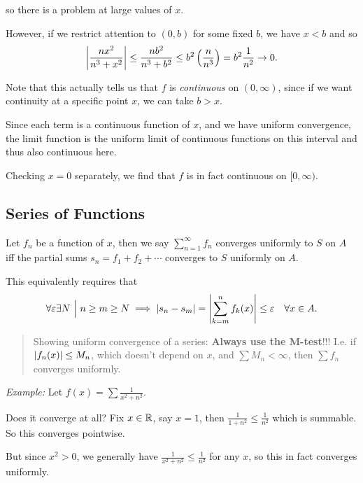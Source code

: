 so there is a problem at large values of \(x\).

However, if we restrict attention to \((0, b)\) for some fixed \(b\), we
have \(x < b\) and so
\begin{align*}
{\left\lvert {\frac{nx^2}{n^3 + x^2}} \right\rvert} \leq
\frac{nb^2}{n^3 + b^2} \leq
b^2 \left( \frac{n}{n^3} \right) =
b^2 \frac 1 {n^2} \to 0.
\end{align*}

Note that this actually tells us that \(f\) is \emph{continuous} on
\((0, \infty)\), since if we want continuity at a specific point \(x\),
we can take \(b>x\).

Since each term is a continuous function of \(x\), and we have uniform
convergence, the limit function is the uniform limit of continuous
functions on this interval and thus also continuous here.

Checking \(x=0\) separately, we find that \(f\) is in fact continuous on
\([0, \infty)\).

\hypertarget{series-of-functions}{%
\subsection{Series of Functions}\label{series-of-functions}}

Let \(f_n\) be a function of \(x\), then we say
\(\sum_{n=1}^\infty f_n\) converges uniformly to \(S\) on \(A\) iff the
partial sums \(s_n = f_1 + f_2 + \cdots\) converges to \(S\) uniformly
on \(A\).

This equivalently requires that
\begin{align*}
\forall\varepsilon \exists N {~\mathrel{\Big|}~} n\geq m \geq N \implies {\left\lvert {s_n - s_m} \right\rvert} = {\left\lvert {\sum_{k=m}^n f_k(x)} \right\rvert} \leq \varepsilon \quad \forall x\in A.
\end{align*}

\begin{quote}
Showing uniform convergence of a series: \textbf{Always use the
M-test}!!! I.e. if \({\left\lvert {f_n(x)} \right\rvert} \leq M_n\), which doesn't depend on
\(x\), and \(\sum M_n < \infty\), then \(\sum f_n\) converges uniformly.
\end{quote}

\emph{Example:} Let \(f(x) = \sum \frac 1 {x^2 + n^2}\).

Does it converge at all? Fix \(x\in {\mathbb{R}}\), say \(x=1\), then
\(\frac 1 {1+n^2} \leq \frac 1 {n^2}\) which is summable. So this
converges pointwise.

But since \(x^2 > 0\), we generally have
\(\frac{1}{x^2 + n^2} \leq \frac{1}{n^2}\) for any \(x\), so this in
fact converges uniformly.

